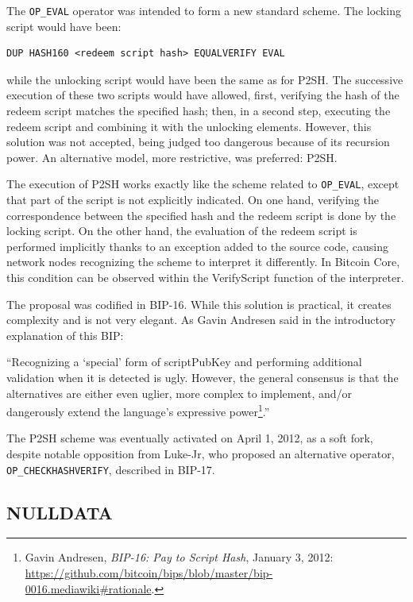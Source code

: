\documentclass[
  a5paper,
  smalldemyvopaper,10pt,twoside,onecolumn,openright,extrafontsizes,hidelinks]{memoir}
\begin{document}
The \texttt{OP\_EVAL} operator was intended to form a new standard
scheme. The locking script would have been:

\begin{verbatim}
DUP HASH160 <redeem script hash> EQUALVERIFY EVAL
\end{verbatim}

while the unlocking script would have been the same as for P2SH. The
successive execution of these two scripts would have allowed, first,
verifying the hash of the redeem script matches the specified hash;
then, in a second step, executing the redeem script and combining it
with the unlocking elements. However, this solution was not accepted,
being judged too dangerous because of its recursion power. An
alternative model, more restrictive, was preferred: P2SH.

The execution of P2SH works exactly like the scheme related to
\texttt{OP\_EVAL}, except that part of the script is not explicitly
indicated. On one hand, verifying the correspondence between the
specified hash and the redeem script is done by the locking script. On
the other hand, the evaluation of the redeem script is performed
implicitly thanks to an exception added to the source code, causing
network nodes recognizing the scheme to interpret it differently. In
Bitcoin Core, this condition can be observed within the VerifyScript
function of the interpreter.

The proposal was codified in BIP-16. While this solution is practical,
it creates complexity and is not very elegant. As Gavin Andresen said in
the introductory explanation of this BIP:

``Recognizing a `special' form of scriptPubKey and performing additional
validation when it is detected is ugly. However, the general consensus
is that the alternatives are either even uglier, more complex to
implement, and/or dangerously extend the language's expressive
power\footnote{Gavin Andresen, \emph{BIP-16: Pay to Script Hash},
  January 3, 2012:
  \url{https://github.com/bitcoin/bips/blob/master/bip-0016.mediawiki\#rationale}.}.''

The P2SH scheme was eventually activated on April 1, 2012, as a soft
fork, despite notable opposition from Luke-Jr, who proposed an
alternative operator, \texttt{OP\_CHECKHASHVERIFY}, described in BIP-17.

\subsection{NULLDATA}\label{nulldata}
\end{document}
